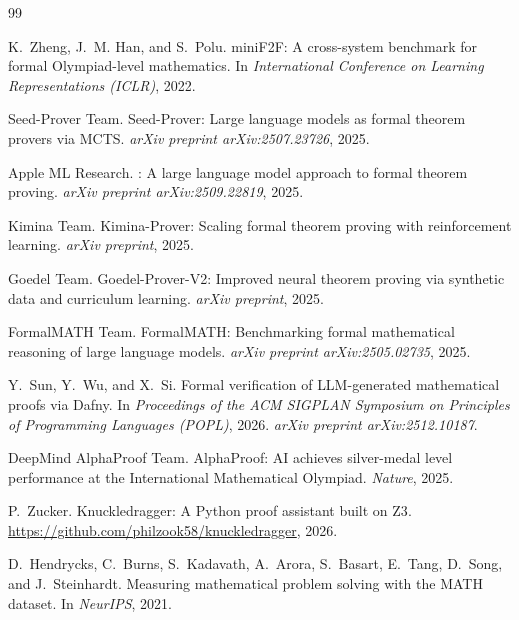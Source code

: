 \documentclass[11pt]{article}
\begin{document}
\begin{thebibliography}{99}

K.~Zheng, J.~M. Han, and S.~Polu.
\newblock mini{F2F}: A cross-system benchmark for formal {O}lympiad-level mathematics.
\newblock In \emph{International Conference on Learning Representations (ICLR)}, 2022.

Seed-Prover Team.
\newblock Seed-{P}rover: Large language models as formal theorem provers via {MCTS}.
\newblock \emph{arXiv preprint arXiv:2507.23726}, 2025.

Apple ML Research.
: A large language model approach to formal theorem proving.
\newblock \emph{arXiv preprint arXiv:2509.22819}, 2025.

Kimina Team.
\newblock Kimina-{P}rover: Scaling formal theorem proving with reinforcement learning.
\newblock \emph{arXiv preprint}, 2025.

Goedel Team.
\newblock Goedel-{P}rover-{V2}: Improved neural theorem proving via synthetic data and curriculum learning.
\newblock \emph{arXiv preprint}, 2025.

FormalMATH Team.
\newblock Formal{MATH}: Benchmarking formal mathematical reasoning of large language models.
\newblock \emph{arXiv preprint arXiv:2505.02735}, 2025.

Y.~Sun, Y.~Wu, and X.~Si.
\newblock Formal verification of {LLM}-generated mathematical proofs via {D}afny.
\newblock In \emph{Proceedings of the ACM SIGPLAN Symposium on Principles of Programming Languages (POPL)}, 2026.
\newblock \emph{arXiv preprint arXiv:2512.10187}.

DeepMind AlphaProof Team.
\newblock Alpha{P}roof: {AI} achieves silver-medal level performance at the {I}nternational {M}athematical {O}lympiad.
\newblock \emph{Nature}, 2025.

P.~Zucker.
\newblock Knuckledragger: A {P}ython proof assistant built on {Z3}.
\newblock \url{https://github.com/philzook58/knuckledragger}, 2026.

D.~Hendrycks, C.~Burns, S.~Kadavath, A.~Arora, S.~Basart, E.~Tang, D.~Song, and J.~Steinhardt.
\newblock Measuring mathematical problem solving with the {MATH} dataset.
\newblock In \emph{NeurIPS}, 2021.


\end{thebibliography}
\end{document}
